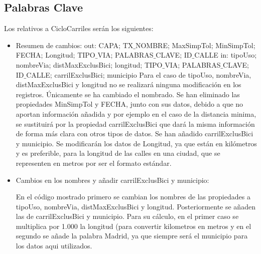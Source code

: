 




\clearpage
\subsection{Palabras Clave}





Los relativos a CicloCarriles serán los siguientes:

\begin{itemize}
	\item Resumen de cambios:
	\newline out: CAPA; TX$\_$NOMBRE; MaxSimpTol; MinSimpTol; FECHA; Longitud; TIPO$\_$VIA; PALABRAS$\_$CLAVE; ID$\_$CALLE
	\newline in: tipoUso; nombreVia; distMaxExclusBici; longitud; TIPO$\_$VIA; PALABRAS$\_$CLAVE; ID$\_$CALLE; carrilExclusBici; municipio
	\newline
    \newline Para el caso de tipoUso, nombreVia, distMaxExclusBici y longitud no se realizará ninguna modificación en los registros. Únicamente se ha cambiado el nombrado.
    \newline Se han eliminado las propiedades MinSimpTol y FECHA, junto con sus datos, debido a que no aportan información añadida y por ejemplo en el caso de la distancia minima, se sustituirá por la propiedad carrilExclusBici que dará la misma información de forma más clara con otros tipos de datos.
    \newline Se han añadido carrilExclusBici y municipio.
    \newline Se modificarán los datos de Longitud, ya que están en kilómetros y es preferible, para la longitud de las calles en una ciudad, que se representen en metros por ser el formato estándar.
    \newline
    
    \item Cambios en los nombres y añadir carrilExclusBici y municipio:
    
    

En el código mostrado primero se cambian los nombres de las propiedades a tipoUso, nombreVia, distMaxExclusBici y longitud. Posteriormente se añaden las de carrilExclusBici y municipio. Para su cálculo, en el primer caso se multiplica por 1.000 la longitud (para convertir kilometros en metros y en el segundo se añade la palabra Madrid, ya que siempre será el municipio para los datos aqui utilizados.
\newline


\end{itemize}
